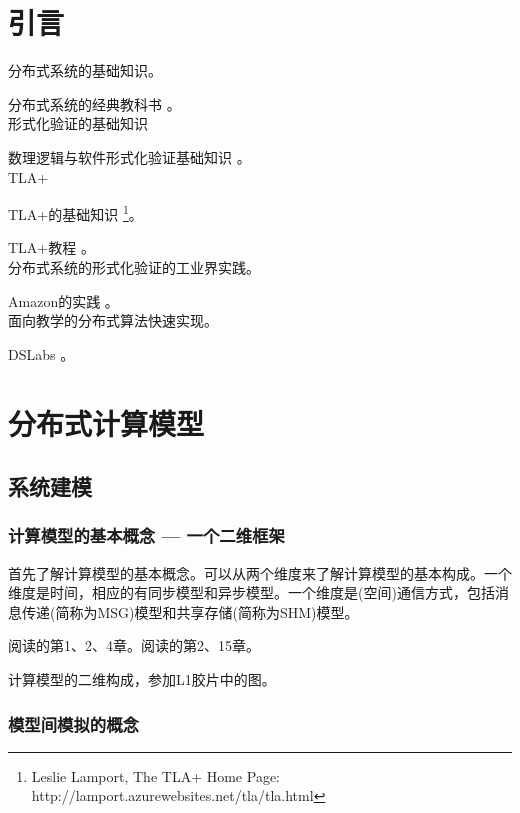 \chapter{引言}

分布式系统的基础知识。

\myleaf 分布式系统的经典教科书 \cite{Tanenbaum06}。\\

形式化验证的基础知识

\myleaf 数理逻辑与软件形式化验证基础知识 \cite{Huth04}。\\

TLA+

\myleaf TLA+的基础知识 \footnote{Leslie Lamport, The TLA+ Home Page: http://lamport.azurewebsites.net/tla/tla.html}。

\myleaf TLA+教程 \cite{Wayne18}。\\

分布式系统的形式化验证的工业界实践。

\myleaf Amazon的实践 \cite{Newcombe15}。\\

面向教学的分布式算法快速实现。

\myleaf DSLabs \cite{Michael19}。

\chapter{分布式计算模型}

\section{系统建模}

\subsection{计算模型的基本概念 --- 一个二维框架}

首先了解计算模型的基本概念。可以从两个维度来了解计算模型的基本构成。一个维度是时间，相应的有同步模型和异步模型。一个维度是(空间)通信方式，包括消息传递(简称为MSG)模型和共享存储(简称为SHM)模型。

\myleaf 阅读\cite{Attiya04}的第1、2、4章。阅读\cite{Aspnes19}的第2、15章。

\myleaf 计算模型的二维构成，参加L1胶片中的图。

\subsection{模型间模拟的概念}

